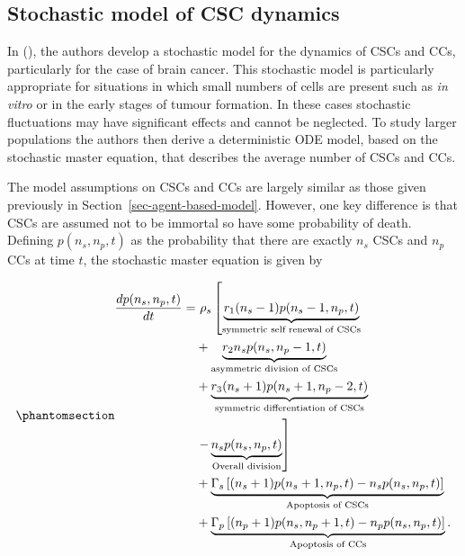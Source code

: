 \documentclass[
  letterpaper,
]{scrreprt}
\theoremstyle{definition}
\theoremstyle{remark}
\begin{document}
\subsection{Stochastic model of CSC
dynamics}\label{sec-stochastic-model}

In (), the authors develop
a stochastic model for the dynamics of CSCs and CCs, particularly for
the case of brain cancer. This stochastic model is particularly
appropriate for situations in which small numbers of cells are present
such as \emph{in vitro} or in the early stages of tumour formation. In
these cases stochastic fluctuations may have significant effects and
cannot be neglected. To study larger populations the authors then derive
a deterministic ODE model, based on the stochastic master equation, that
describes the average number of CSCs and CCs.

The model assumptions on CSCs and CCs are largely similar as those given
previously in Section~\ref{sec-agent-based-model}. However, one key
difference is that CSCs are assumed not to be immortal so have some
probability of death. Defining \(p(n_s, n_p,t)\) as the probability that
there are exactly \(n_s\) CSCs and \(n_p\) CCs at time \(t\), the
stochastic master equation is given by

\begin{equation}\phantomsection\label{eq-stochastic-master-equation}{
\begin{aligned}
\frac{dp(n_s,n_p,t)}{dt} = & \ \rho_s \left[ \underbrace{r_1 (n_s - 1) p(n_s - 1, n_p, t)}_{\text{symmetric self renewal of CSCs}} \right. \\
& + \underbrace{r_2 n_s p(n_s, n_p - 1, t)}_{\text{asymmetric division of CSCs}} \\
& + \underbrace{r_3 (n_s + 1) p(n_s + 1, n_p - 2, t)}_{\text{symmetric differentiation of CSCs}} \\
& \left. - \underbrace{n_s p(n_s, n_p, t)}_\text{Overall division} \right] \\
& + \underbrace{\Gamma_s \left[ (n_s + 1) p(n_s + 1, n_p, t) - n_s p(n_s, n_p, t) \right]}_\text{Apoptosis of CSCs} \\
& + \underbrace{\Gamma_p \left[ (n_p + 1) p(n_s, n_p + 1, t) - n_p p(n_s, n_p, t) \right]}_\text{Apoptosis of CCs}.
\end{aligned}
}\end{equation}
\end{document}

